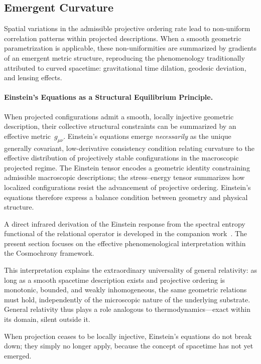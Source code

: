 \subsection{Emergent Curvature}
  \label{subsec:emergent-curvature}

  Spatial variations in the admissible projective ordering rate lead to
  non-uniform correlation patterns within projected descriptions.
  When a smooth geometric parametrization is applicable, these
  non-uniformities are summarized by gradients of an emergent metric
  structure, reproducing the phenomenology traditionally attributed to
  curved spacetime: gravitational time dilation, geodesic deviation, and
  lensing effects.

  \paragraph{Einstein's Equations as a Structural Equilibrium Principle.}
    \label{subsec:einstein-equilibrium-principle}
    When projected configurations admit a smooth, locally injective geometric
    description, their collective structural constraints can be summarized by
    an effective metric~$g_{\mu\nu}$.
    Einstein's equations emerge \emph{necessarily} as the unique generally covariant,
    low-derivative consistency condition relating curvature to the effective
    distribution of projectively stable configurations in the macroscopic projected regime.
    The Einstein tensor encodes a geometric identity constraining admissible
    macroscopic descriptions; the stress--energy tensor summarizes how localized
    configurations resist the advancement of projective ordering.
    Einstein's equations therefore express a balance condition between
    geometry and physical structure.

    A direct infrared derivation of the Einstein response from the spectral
    entropy functional of the relational operator is developed in the
    companion work~\cite{Beau2026h}.
    The present section focuses on the effective phenomenological
    interpretation within the Cosmochrony framework.

    This interpretation explains the extraordinary universality of general
    relativity: as long as a smooth spacetime description exists and projective ordering
    is monotonic, bounded, and weakly inhomogeneous, the same geometric relations must hold,
    independently of the microscopic nature of the underlying substrate.
    General relativity thus plays a role analogous to thermodynamics---exact
    within its domain, silent outside it.

    When projection ceases to be locally injective, Einstein's equations do
    not break down; they simply no longer apply, because the concept of
    spacetime has not yet emerged.

